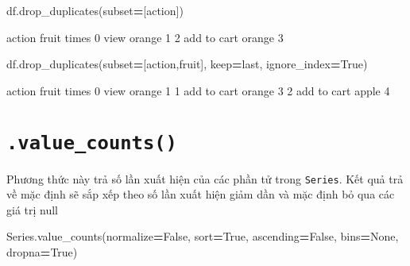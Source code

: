 \documentclass[
]{book}
\newenvironment{Shaded}{\begin{snugshade}}{\end{snugshade}}
\newcommand{\NormalTok}[1]{#1}
\newcommand{\OperatorTok}[1]{\textcolor[rgb]{0.81,0.36,0.00}{\textbf{#1}}}
\newcommand{\StringTok}[1]{\textcolor[rgb]{0.31,0.60,0.02}{#1}}
\newcommand{\VariableTok}[1]{\textcolor[rgb]{0.00,0.00,0.00}{#1}}
\begin{document}
\begin{Shaded}
\begin{Highlighting}[]
\NormalTok{df.drop\_duplicates(subset}\OperatorTok{=}\NormalTok{[}\StringTok{\textquotesingle{}action\textquotesingle{}}\NormalTok{])}
\end{Highlighting}
\end{Shaded}

\begin{Shaded}
\begin{Highlighting}[]
\NormalTok{        action  fruit   times}
\NormalTok{0         view  orange      1}
\NormalTok{2  add to cart  orange      3}
\end{Highlighting}
\end{Shaded}

\begin{Shaded}
\begin{Highlighting}[]
\NormalTok{df.drop\_duplicates(subset}\OperatorTok{=}\NormalTok{[}\StringTok{\textquotesingle{}action\textquotesingle{}}\NormalTok{,}\StringTok{\textquotesingle{}fruit\textquotesingle{}}\NormalTok{], keep}\OperatorTok{=}\StringTok{\textquotesingle{}last\textquotesingle{}}\NormalTok{, ignore\_index}\OperatorTok{=}\VariableTok{True}\NormalTok{)}
\end{Highlighting}
\end{Shaded}

\begin{Shaded}
\begin{Highlighting}[]
\NormalTok{        action   fruit  times}
\NormalTok{0         view  orange      1}
\NormalTok{1  add to cart  orange      3}
\NormalTok{2  add to cart   apple      4}
\end{Highlighting}
\end{Shaded}

\section{\texorpdfstring{\texttt{.value\_counts()}}{.value\_counts()}}\label{value_counts}

Phương thức này trả số lần xuất hiện của các phần tử trong \texttt{Series}. Kết quả trả về mặc định sẽ sắp xếp theo số lần xuất hiện giảm dần và mặc định bỏ qua các giá trị null

\begin{Shaded}
\begin{Highlighting}[]
\NormalTok{Series.value\_counts(normalize}\OperatorTok{=}\VariableTok{False}\NormalTok{, sort}\OperatorTok{=}\VariableTok{True}\NormalTok{, ascending}\OperatorTok{=}\VariableTok{False}\NormalTok{, bins}\OperatorTok{=}\VariableTok{None}\NormalTok{, dropna}\OperatorTok{=}\VariableTok{True}\NormalTok{)}
\end{Highlighting}
\end{Shaded}
\end{document}
